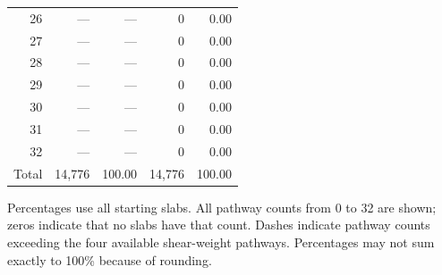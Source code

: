 \begin{table}[t]
\begin{threeparttable}
\begin{tabular}{@{}rrrrr@{}}
26 & --- & --- & 0 & 0.00 \\
27 & --- & --- & 0 & 0.00 \\
28 & --- & --- & 0 & 0.00 \\
29 & --- & --- & 0 & 0.00 \\
30 & --- & --- & 0 & 0.00 \\
31 & --- & --- & 0 & 0.00 \\
32 & --- & --- & 0 & 0.00 \\
\midrule
Total & 14{,}776 & 100.00 & 14{,}776 & 100.00 \\
\bottomrule
\end{tabular}
\begin{tablenotes}[flushleft]\footnotesize
\item Percentages use all starting slabs. All pathway counts from 0 to 32 are shown; zeros indicate that no slabs have that count. Dashes indicate pathway counts exceeding the four available shear-weight pathways. Percentages may not sum exactly to 100\% because of rounding.
\end{tablenotes}
\end{threeparttable}
\end{table}
